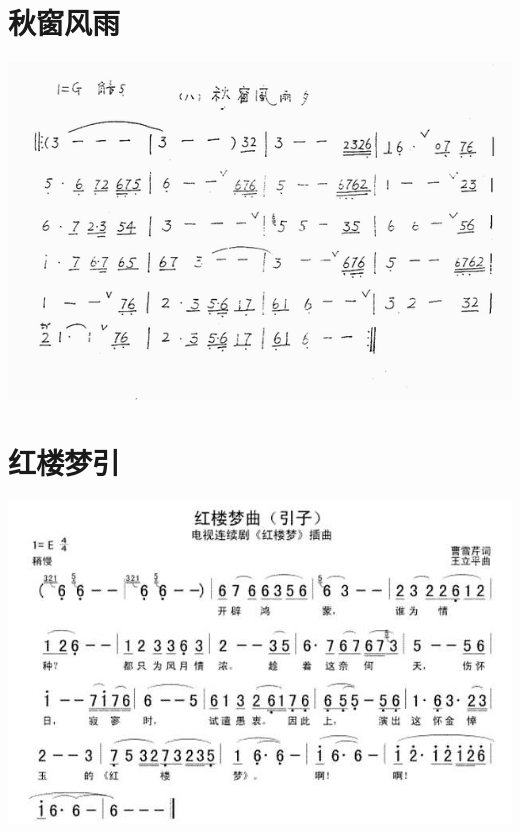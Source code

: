 \documentclass[cn,pad,chinese,chinesefont=nofont]{elegantbook}
\begin{document}
\section{秋窗风雨}
    \includegraphics[width=\textwidth]{dongxiao/秋窗风雨.jpg}
\section{红楼梦引}
    \includegraphics[width=\textwidth]{dongxiao/红楼梦引.jpg}
\end{document}
